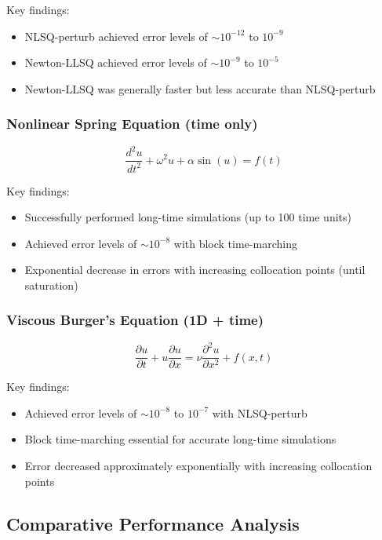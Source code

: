 \documentclass[11pt,a4paper]{article}
\begin{document}
Key findings:
\begin{itemize}
    \item NLSQ-perturb achieved error levels of $\sim 10^{-12}$ to $10^{-9}$
    \item Newton-LLSQ achieved error levels of $\sim 10^{-9}$ to $10^{-5}$
    \item Newton-LLSQ was generally faster but less accurate than NLSQ-perturb
\end{itemize}

\subsubsection{Nonlinear Spring Equation (time only)}
\begin{equation}
    \frac{d^2u}{dt^2} + \omega^2 u + \alpha \sin(u) = f(t)
\end{equation}

Key findings:
\begin{itemize}
    \item Successfully performed long-time simulations (up to 100 time units)
    \item Achieved error levels of $\sim 10^{-8}$ with block time-marching
    \item Exponential decrease in errors with increasing collocation points (until saturation)
\end{itemize}

\subsubsection{Viscous Burger's Equation (1D + time)}
\begin{equation}
    \frac{\partial u}{\partial t} + u\frac{\partial u}{\partial x} = \nu \frac{\partial^2 u}{\partial x^2} + f(x,t)
\end{equation}

Key findings:
\begin{itemize}
    \item Achieved error levels of $\sim 10^{-8}$ to $10^{-7}$ with NLSQ-perturb
    \item Block time-marching essential for accurate long-time simulations
    \item Error decreased approximately exponentially with increasing collocation points
\end{itemize}

\subsection{Comparative Performance Analysis}
\end{document}
